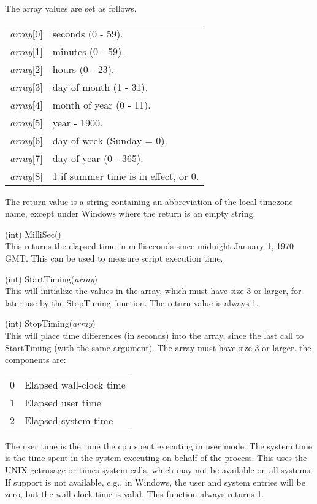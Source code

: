\begin{description}
The array values are set as follows.

\begin{tabular}{ll}
{\it array\/}[0] & seconds (0 - 59).\\
{\it array\/}[1] & minutes (0 - 59).\\
{\it array\/}[2] & hours (0 - 23).\\
{\it array\/}[3] & day of month (1 - 31).\\
{\it array\/}[4] & month of year (0 - 11).\\
{\it array\/}[5] & year - 1900.\\
{\it array\/}[6] & day of week (Sunday = 0).\\
{\it array\/}[7] & day of year (0 - 365).\\
{\it array\/}[8] & 1 if summer time is in effect, or 0.\\
\end{tabular}

The return value is a string containing an abbreviation of the local
timezone name, except under Windows where the return is an empty
string.

\item{(int) \vt MilliSec()}\\
This returns the elapsed time in milliseconds since midnight January
1, 1970 GMT.  This can be used to measure script execution time.

\item{(int) \vt StartTiming({\it array\/})}\\
This will initialize the values in the array, which must have size 3
or larger, for later use by the {\vt StopTiming} function.  The return
value is always 1.

\item{(int) \vt StopTiming({\it array\/})}\\
This will place time differences (in seconds) into the array, since
the last call to {\vt StartTiming} (with the same argument).  The
array must have size 3 or larger.  the components are:

\begin{tabular}{ll}\\
0 & Elapsed wall-clock time\\
1 & Elapsed user time\\
2 & Elapsed system time\\
\end{tabular}

The user time is the time the cpu spent executing in user mode.  The
system time is the time spent in the system executing on behalf of the
process.  This uses the UNIX {\vt getrusage} or {\vt times} system
calls, which may not be available on all systems.  If support is not
available, e.g., in Windows, the user and system entries will be zero,
but the wall-clock time is valid.  This function always returns 1.

\end{description}


